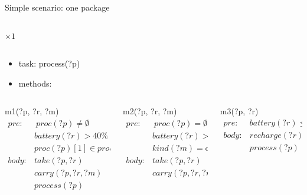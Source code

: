 \begin{frame}[fragile]{Simple scenario: one package}
\begin{columns}
\begin{column}{0.5\textwidth}
            \LARGE \emph{$\times 1$}
        \end{column}
    \end{columns}
    \pause
    \begin{itemize}
        \item task: process(?p)
        \item methods:
    \end{itemize}
    \footnotesize
    \begin{columns}[t]
        \begin{column}{0.32\textwidth}
            m1(?p, ?r, ?m)
            \begin{align*}
                pre: &\ proc(?p) \neq \emptyset \\
                 &battery(?r) > 40\% \\
                 &proc(?p)[1] \in proc(?m) \\
                 body:&take(?p,?r) \\
                     &carry(?p,?r,?m) \\
                     &process(?p)
            \end{align*}
        \end{column}
        \begin{column}{0.32\textwidth}
            m2(?p, ?r, ?m)
            \begin{align*}
                pre: &\ proc(?p)  = \emptyset \\
                 &battery(?r) > 40\% \\
                 &kind(?m) = \text{output} \\
                 body:&take(?p,?r) \\
                     &carry(?p,?r,?m) \\
            \end{align*}
        \end{column}
        \begin{column}{0.32\textwidth}
            m3(?p, ?r) 
            \begin{align*}  
                pre: &battery(?r) \leq 40\% \\
                 body:&recharge(?r) \\
                     &process(?p)
            \end{align*}
        \end{column}
    \end{columns}

\end{frame}
